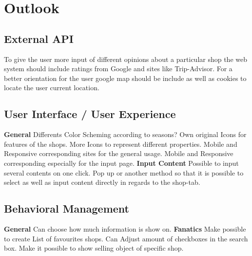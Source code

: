 \section{Outlook}

\subsection{External API}
To give the user more input of different opinions about a particular shop the web system should include ratings from Google and sites like Trip-Advisor.
For a better orientation for the user google map should be include as well as cookies to locate the user current location.
\subsection{User Interface / User Experience}
\textbf{General}
Differents Color Scheming according to seasons?
Own original Icons for features of the shops.
More Icons to represent different properties.
Mobile and Responsive corresponding sites for the general usage.
Mobile and Responsive corresponding especially for the input page.
\textbf{Input Content}
Possible to input several contents on one click.
Pop up or another  method so that it is possible to select as well as input content directly in regards to the shop-tab.

\subsection{Behavioral Management}
\textbf{General}
Can choose how much information is show on. 
\textbf{Fanatics}
Make possible to create List of favourites shops.
Can Adjust amount of checkboxes in the search box.
Make it possible to show selling object of specific shop. 

